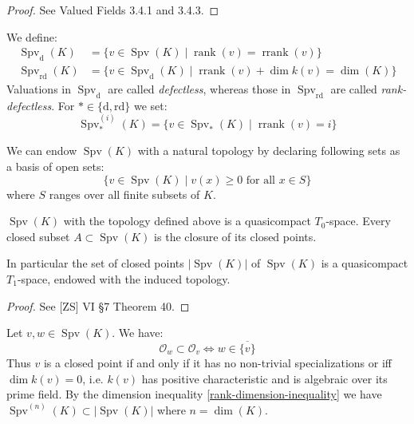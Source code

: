 \begin{proof}
See Valued Fields 3.4.1 and 3.4.3.
\end{proof}

\begin{definition}
We define:
\begin{align*}
\operatorname{Spv}_\text{d}(K) &= \{v\in\operatorname{Spv}(K)\mid\operatorname{rank}(v)=\operatorname{rrank}(v) \} \\
\operatorname{Spv}_\text{rd}(K) &= \{v\in\operatorname{Spv}_\text{d}(K)\mid \operatorname{rrank}(v)+\dim k(v)=\dim(K) \}
\end{align*}
Valuations in $\operatorname{Spv}_\text{d}$ are called \textit{defectless}, whereas those in $\operatorname{Spv}_\text{rd}$ are called \textit{rank-defectless}. For $\ast\in\{\text{d},\text{rd}\}$ we set:
\[\operatorname{Spv}_\ast^{(i)}(K)=\{v\in\operatorname{Spv}_\ast(K)\mid \operatorname{rrank}(v)=i \} \]
\end{definition}

\begin{definition}
We can endow $\operatorname{Spv}(K)$ with a natural topology by declaring following sets as a basis of open sets:
\[\{v\in\operatorname{Spv}(K)\mid v(x)\geq 0\text{ for all }x\in S\} \]
where $S$ ranges over all finite subsets of $K$. 
\end{definition}

\begin{lemma}\label{spv-topology}
$\operatorname{Spv}(K)$ with the topology defined above is a quasicompact $T_0$-space. Every closed subset $A\subset\operatorname{Spv}(K)$ is the closure of its closed points. 

In particular the set of closed points $|\operatorname{Spv}(K)|$ of $\operatorname{Spv}(K)$ is a quasicompact $T_1$-space, endowed with the induced topology. 
\end{lemma}

\begin{proof}
See [ZS] VI §7 Theorem 40.
\end{proof}

\begin{lemma}\label{2.2-prepre}
Let $v,w\in\operatorname{Spv}(K)$. We have:
\[\mathcal{O}_w\subset\mathcal{O}_v \iff w\in\overline{\{v\}} \]
Thus $v$ is a closed point if and only if it has no non-trivial specializations or iff $\dim k(v)=0$, i.e. $k(v)$ has positive characteristic and is algebraic over its prime field. By the dimension inequality \ref{rank-dimension-inequality} we have $\operatorname{Spv}^{(n)}(K)\subset |\operatorname{Spv}(K)|$ where $n=\dim(K)$.
\end{lemma}

